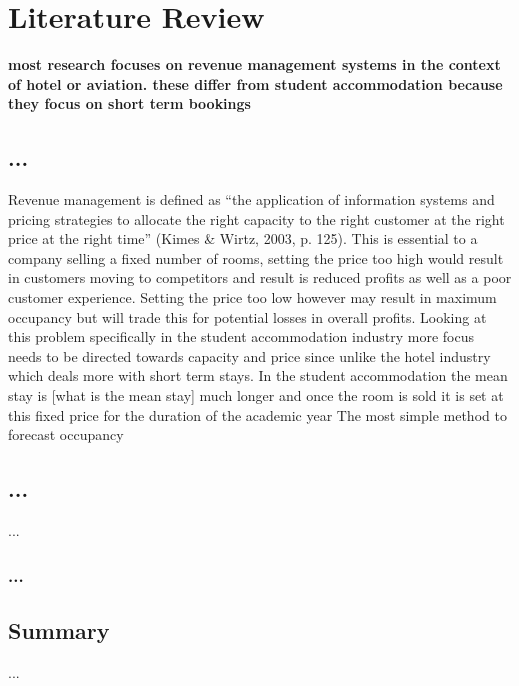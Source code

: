 \chapter{Literature Review}
\label{ch:lit_rev}

\textbf{most research focuses on revenue management systems in the context of hotel or aviation. these differ from student accommodation because they focus on short term bookings}
\section{...}
Revenue management is defined as “the application of information systems and pricing strategies to allocate the right capacity to the right customer at the right price at the right time” (Kimes & Wirtz, 2003, p. 125). This is essential to a company selling a fixed number of rooms, setting the price too high would result in customers  moving to competitors and result is reduced profits as well as a poor customer experience. Setting the price too low however may result in maximum occupancy but will trade this for potential losses in overall profits.
Looking at this problem specifically in the student accommodation industry more focus needs to be directed towards capacity and price since unlike the hotel industry which deals more with short term stays. In the student accommodation the mean stay is [what is the mean stay] much longer and once the room is sold it is set at this fixed price for the duration of the academic year
The most simple method to forecast occupancy 


\section{...}
...


\subsection{...}


\section{Summary}
...


